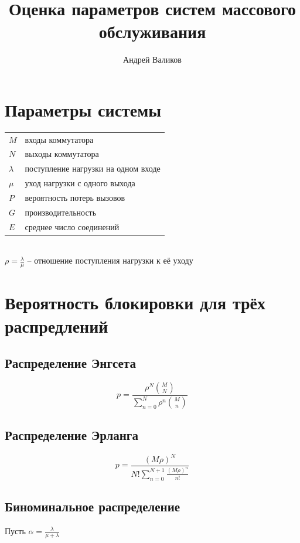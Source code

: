 \documentclass[12pt]{article}
\begin{document}
\title{Оценка параметров систем массового обслуживания}
\author{Андрей Валиков}
\date{}
\maketitle

\section{Параметры системы}\label{sec:systemParams}

\begin{tabular}{l l}
    $M$ & входы коммутатора \\
    $N$ & выходы коммутатора \\
    $\lambda$ & поступление нагрузки на одном входе \\
    $\mu$ & уход нагрузки с одного выхода \\
    $P$ & вероятность потерь вызовов \\
    $G$ & производительность \\
    $E$ & среднее число соединений \\
\end{tabular} \\
    $\rho = \frac{\lambda}{\mu}$ -- отношение поступления нагрузки к её уходу 

																																																							

\section{Вероятность блокировки для трёх распредлений}\label{sec:prob}


\subsection{Распределение Энгсета}\label{subsec:engset}

 \[
     p = \frac{\rho ^ N \binom{M}{N}}
     {\sum_{n=0}^{N} \rho ^ n \binom{M}{n}}
 \]

\subsection{Распределение Эрланга}\label{subsec:erlang}

\[
     p = \frac{(M \rho) ^ N}
     {N!\sum_{n=0}^{N + 1} \frac{(M \rho) ^ n}{n!}}
\]

\subsection{Биноминальное распределение}\label{subsec:binom}
Пусть $\alpha = \frac{\lambda}{\mu + \lambda}$
\end{document}
